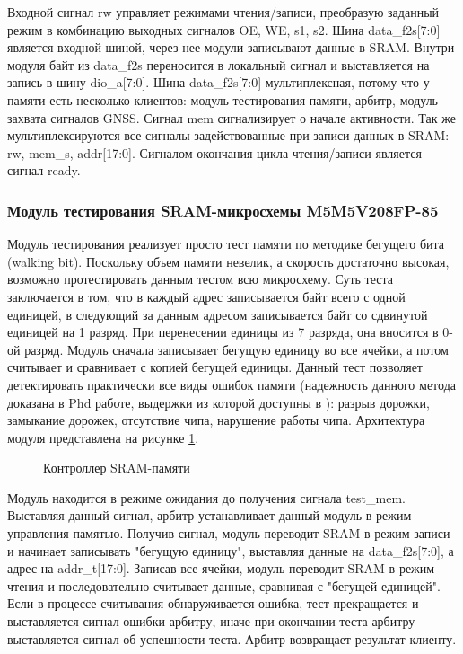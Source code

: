 Входной сигнал rw управляет режимами чтения/записи, преобразую заданный режим в комбинацию выходных сигналов OE, WE, s1, s2.
Шина data\_f2s[7:0] является входной шиной, через нее модули записывают данные в SRAM. Внутри модуля байт из data\_f2s
переносится в локальный сигнал и выставляется на запись в шину dio\_a[7:0]. Шина data\_f2s[7:0] мультиплексная, потому что 
у памяти есть несколько клиентов: модуль тестирования памяти, арбитр, модуль захвата сигналов GNSS. Сигнал mem сигнализирует о начале
активности. Так же мультиплексируются все сигналы задействованные при записи данных в SRAM: rw, mem\_s, addr[17:0]. Сигналом окончания
цикла чтения/записи является сигнал ready.

\subsubsection{Модуль тестирования SRAM-микросхемы M5M5V208FP-85}
\label{sec:test_sram}
Модуль тестирования реализует просто тест памяти по методике бегущего бита (walking bit). Поскольку объем памяти невелик, а скорость
достаточно высокая, возможно протестировать данным тестом всю микросхему. Суть теста заключается в том, что в каждый адрес записывается
байт всего с одной единицей, в следующий за данным адресом записывается байт со сдвинутой единицей на 1 разряд. При перенесении единицы
из 7 разряда, она вносится в 0-ой разряд. Модуль сначала записывает бегущую единицу во все ячейки, а потом считывает и сравнивает с
копией бегущей единицы. Данный тест позволяет детектировать практически все виды ошибок памяти
(надежность данного метода доказана в Phd работе, выдержки из которой доступны в \cite{fast_mem_test}):
разрыв дорожки, замыкание дорожек, отсутствие чипа, нарушение работы чипа. Архитектура модуля представлена на рисунке
\ref{pic:test_sram_arch}.

\begin{figure}[H]
\begin{center}
\end{center}
\caption{Контроллер SRAM-памяти}
\label{pic:test_sram_arch}
\end{figure}

Модуль находится в режиме ожидания до получения сигнала test\_mem. Выставляя данный сигнал, арбитр устанавливает данный модуль
в режим управления памятью. Получив сигнал, модуль переводит SRAM в режим записи и начинает записывать "бегущую единицу",
выставляя данные на data\_f2s[7:0], а адрес на addr\_t[17:0]. Записав все ячейки, модуль переводит SRAM в режим чтения и последовательно
считывает данные, сравнивая с "бегущей единицей". Если в процессе считывания обнаруживается ошибка, тест прекращается и 
выставляется сигнал ошибки арбитру, иначе при окончании теста арбитру выставляется сигнал об успешности теста. Арбитр возвращает
результат клиенту.


